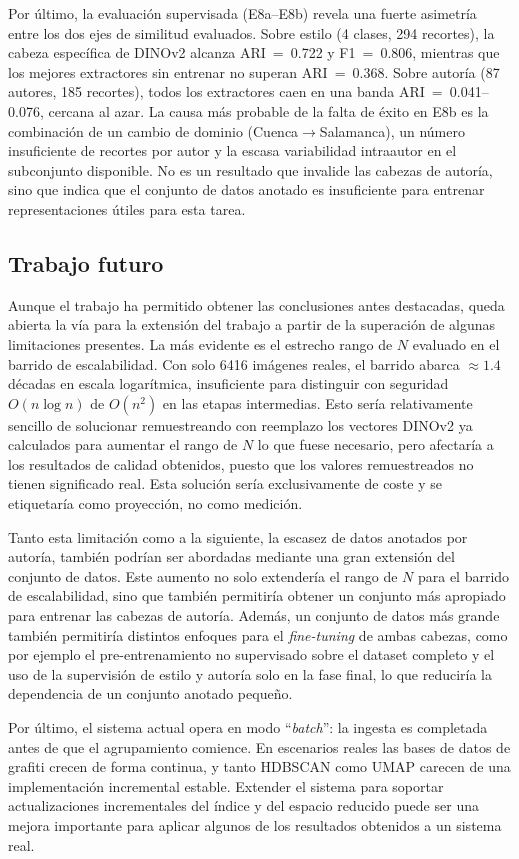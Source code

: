 Por último, la evaluación supervisada (E8a--E8b) revela una fuerte asimetría
entre los dos ejes de similitud evaluados. Sobre estilo (4 clases, 294
recortes), la cabeza específica de DINOv2 alcanza ARI~=~0.722 y F1~=~0.806,
mientras que los mejores extractores sin entrenar no superan ARI~=~0.368. Sobre
autoría (87 autores, 185 recortes), todos los extractores caen en una banda
ARI~=~0.041--0.076, cercana al azar. La causa más probable de la falta de éxito
en E8b es la combinación de un cambio de dominio (Cuenca$\to$Salamanca), un
número insuficiente de recortes por autor y la escasa variabilidad intraautor
en el subconjunto disponible. No es un resultado que invalide las cabezas de
autoría, sino que indica que el conjunto de datos anotado es insuficiente para
entrenar representaciones útiles para esta tarea.

\subsection{Trabajo futuro}
\label{sec:future-work}

Aunque el trabajo ha permitido obtener las conclusiones antes destacadas, queda
abierta la vía para la extensión del trabajo a partir de la superación de
algunas limitaciones presentes. La más evidente es el estrecho rango de $N$
evaluado en el barrido de escalabilidad. Con solo 6416 imágenes reales, el
barrido abarca $\approx 1.4$ décadas en escala logarítmica, insuficiente para
distinguir con seguridad $O(n \log n)$ de $O(n^2)$ en las etapas intermedias.
Esto sería relativamente sencillo de solucionar remuestreando con reemplazo los
vectores DINOv2 ya calculados para aumentar el rango de $N$ lo que fuese
necesario, pero afectaría a los resultados de calidad obtenidos, puesto que los
valores remuestreados no tienen significado real. Esta solución sería
exclusivamente de coste y se etiquetaría como proyección, no como medición.

Tanto esta limitación como a la siguiente, la escasez de datos anotados por
autoría, también podrían ser abordadas mediante una gran extensión del conjunto
de datos. Este aumento no solo extendería el rango de $N$ para el barrido de
escalabilidad, sino que también permitiría obtener un conjunto más apropiado
para entrenar las cabezas de autoría. Además, un conjunto de datos más grande
también permitiría distintos enfoques para el \textit{fine-tuning} de ambas
cabezas, como por ejemplo el pre-entrenamiento no supervisado sobre el dataset 
completo y el uso de la supervisión de estilo y autoría solo en la fase final,
lo que reduciría la dependencia de un conjunto anotado pequeño.

Por último, el sistema actual opera en modo \enquote{\textit{batch}}: la
ingesta es completada antes de que el agrupamiento comience. En escenarios
reales las bases de datos de grafiti crecen de forma continua, y tanto HDBSCAN
como UMAP carecen de una implementación incremental estable. Extender el
sistema para soportar actualizaciones incrementales del índice y del espacio
reducido puede ser una mejora importante para aplicar algunos de los resultados
obtenidos a un sistema real.

